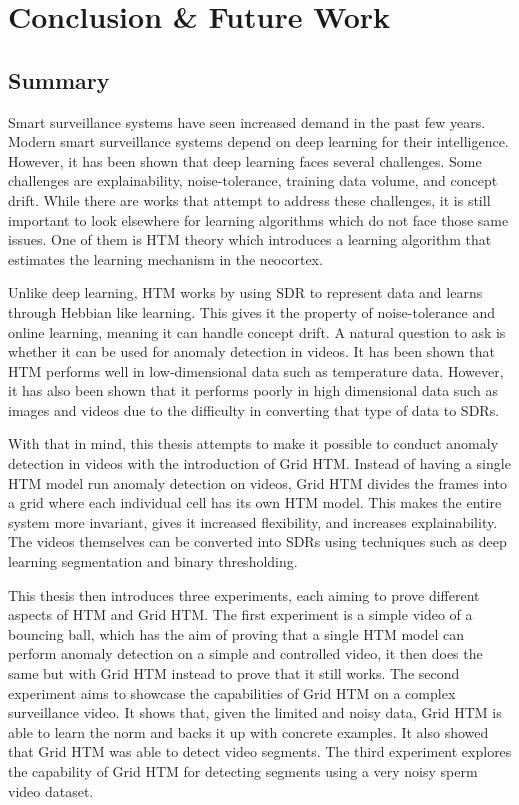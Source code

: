\chapter{Conclusion \& Future Work}
\label{sec:conclusion}
\section{Summary}
Smart surveillance systems have seen increased demand in the past few years. Modern smart surveillance systems depend on deep learning for their intelligence. However, it has been shown that deep learning faces several challenges. Some challenges are explainability, noise-tolerance, training data volume, and concept drift. While there are works that attempt to address these challenges, it is still important to look elsewhere for learning algorithms which do not face those same issues. One of them is HTM theory which introduces a learning algorithm that estimates the learning mechanism in the neocortex.
\par
Unlike deep learning, HTM works by using SDR to represent data and learns through Hebbian like learning. This gives it the property of noise-tolerance and online learning, meaning it can handle concept drift. A natural question to ask is whether it can be used for anomaly detection in videos. It has been shown that HTM performs well in low-dimensional data such as temperature data. However, it has also been shown that it performs poorly in high dimensional data such as images and videos due to the difficulty in converting that type of data to SDRs.
\par
With that in mind, this thesis attempts to make it possible to conduct anomaly detection in videos with the introduction of Grid HTM. Instead of having a single HTM model run anomaly detection on videos, Grid HTM divides the frames into a grid where each individual cell has its own HTM model. This makes the entire system more invariant, gives it increased flexibility, and increases explainability. The videos themselves can be converted into SDRs using techniques such as deep learning segmentation and binary thresholding.
\par
This thesis then introduces three experiments, each aiming to prove different aspects of HTM and Grid HTM. The first experiment is a simple video of a bouncing ball, which has the aim of proving that a single HTM model can perform anomaly detection on a simple and controlled video, it then does the same but with Grid HTM instead to prove that it still works. The second experiment aims to showcase the capabilities of Grid HTM on a complex surveillance video. It shows that, given the limited and noisy data, Grid HTM is able to learn the norm and backs it up with concrete examples. It also showed that Grid HTM was able to detect video segments. The third experiment explores the capability of Grid HTM for detecting segments using a very noisy sperm video dataset.
